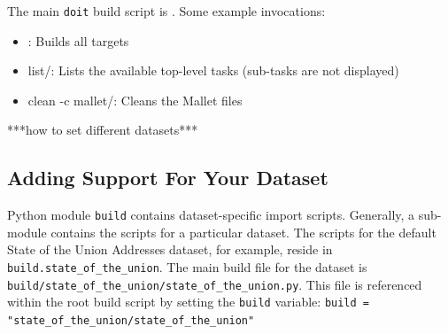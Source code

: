 \documentclass[11pt]{article}
\begin{document}
The main \texttt{doit} build script is \texttt{\buildscript}. Some example invocations:
\begin{itemize}
 \item \texttt{\buildscript}: Builds all targets
 \item \texttt{\buildscript} list/: Lists the available top-level tasks (sub-tasks are not displayed)
 \item \texttt{\buildscript} clean -c mallet/: Cleans the Mallet files
\end{itemize}

%

***how to set different datasets***

\subsection{Adding Support For Your Dataset}
Python module \texttt{build} contains dataset-specific import scripts.
Generally, a sub-module contains the scripts for a particular dataset. The
scripts for the default State of the Union Addresses dataset, for example,
reside in \texttt{build.state\_\allowbreak{}of\_\allowbreak{}the\_\allowbreak{}union}. The main build file for the dataset
is \texttt{build/\allowbreak{}state\_\allowbreak{}of\_\allowbreak{}the\_\allowbreak{}union/\allowbreak{}state\_\allowbreak{}of\_\allowbreak{}the\_\allowbreak{}union.py}. This file is
referenced within the root \texttt{\buildscript} build script by setting the
\texttt{build} variable:
\texttt{build = "state\_\allowbreak{}of\_\allowbreak{}the\_\allowbreak{}union/\allowbreak{}state\_\allowbreak{}of\_\allowbreak{}the\_\allowbreak{}union"}

\end{document}
